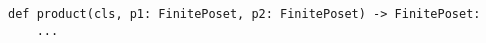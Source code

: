 \begin{verbatim}
def product(cls, p1: FinitePoset, p2: FinitePoset) -> FinitePoset:
    ...
\end{verbatim}